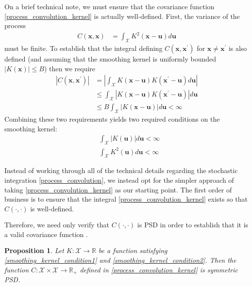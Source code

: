 \documentclass[12pt]{article}
\newcommand*{\abs}[1]{\left\lvert#1\right\rvert}
\newcommand{\R}{\mathbb{R}}
\newcommand{\Ker}{K}
\newcommand{\covFun}{C}
\newcommand{\locSpace}{\mathcal{X}}
\newcommand{\loc}{\mathbf{x}}
\newcommand{\locTwo}{\loc^\prime}
\newcommand{\locDum}{\mathbf{u}}
\newtheorem{prop}{Proposition}
\begin{document}
On a brief technical note, we must ensure that the covariance function \ref{process_convolution_kernel} is actually well-defined. First, the variance of the process 
\begin{align*}
\covFun(\loc, \loc) &= \int_{\locSpace} \Ker^2(\loc - \locDum) d\locDum
\end{align*}
must be finite. To establish that the integral defining $\covFun(\loc, \locTwo)$ for $\loc \neq \locTwo$ is also defined (and assuming that the smoothing kernel is uniformly bounded 
$\abs{\Ker(\loc)} \leq B$) then we require 
\begin{align*}
\abs{\covFun(\loc, \locTwo)} &= \abs{\int_{\locSpace} \Ker(\loc - \locDum)\Ker(\locTwo - \locDum) d\locDum} \\
				  	   &\leq  \int_{\locSpace} \abs{\Ker(\loc - \locDum)\Ker(\locTwo - \locDum)} d\locDum \\
					   &\leq B \int_{\locSpace} \abs{\Ker(\loc - \locDum)} d\locDum < \infty
\end{align*}
Combining these two requirements yields two required conditions on the smoothing kernel:
\begin{align}
&\int_{\locSpace} \abs{\Ker(\locDum)} d\locDum < \infty  \label{smoothing_kernel_condition1} \\
&\int_{\locSpace} \Ker^2(\locDum) d\locDum < \infty \label{smoothing_kernel_condition2}
\end{align}

Instead of working through all of the technical details regarding the stochastic integration \ref{process_convolution}, we instead opt for the simpler approach of taking \ref{process_convolution_kernel}
as our starting point. The first order of business is to ensure that the integral \ref{process_convolution_kernel} exists so that $\covFun(\cdot, \cdot)$ is well-defined. 


Therefore, we need only verify that $\covFun(\cdot, \cdot)$ is PSD in order to establish that it is a valid covariance function \cite{Paciorek}. 

\begin{prop} \label{process_convolution_kernel_PSD}
Let $\Ker: \locSpace \to \R$ be a function satisfying \ref{smoothing_kernel_condition1} and \ref{smoothing_kernel_condition2}. 
Then the function $\covFun: \locSpace \times \locSpace \to \R_+$ defined in \ref{process_convolution_kernel} is symmetric PSD. 
\end{prop}
\end{document}
